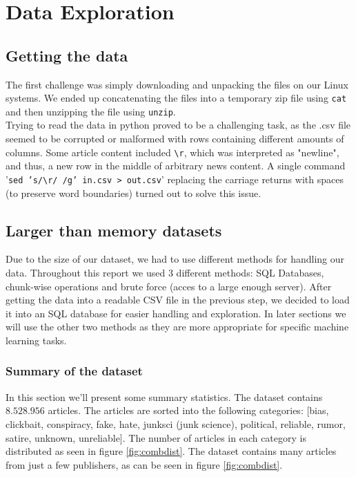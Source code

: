 \section{Data Exploration}

\subsection{Getting the data}
The first challenge was simply downloading and unpacking the files on our Linux systems. We ended up concatenating the
files into a temporary zip file using \texttt{cat} and then unzipping the file using \texttt{unzip}. \\

Trying to read the data in python proved to be a challenging task, as the .csv file seemed to be corrupted or malformed with rows containing different amounts of columns. Some article content included \texttt{\textbackslash r}, which was interpreted as "newline", and thus, a new row in the middle of arbitrary news content. A single command '\texttt{sed 's/\textbackslash r/ /g' in.csv > out.csv}' replacing the carriage returns with spaces (to preserve word boundaries) turned out to solve this issue.\\

\subsection{Larger than memory datasets}
Due to the size of our dataset, we had to use different methods for handling our data. Throughout this report we used 3 different methods: SQL Databases, chunk-wise operations and brute force (acces
to a large enough server). After getting the data into a readable CSV file in the previous step, we decided to load it
into an SQL database for easier handling and exploration. In later sections we will use the other two methods as they
are more appropriate for specific machine learning tasks.


\subsubsection{Summary of the dataset}
In this section we'll present some summary statistics. The dataset contains $ 8.528.956 $ articles. The articles are
sorted into the following categories: [bias, clickbait, conspiracy, fake, hate, junksci (junk science), political,
reliable, rumor, satire, unknown, unreliable]. The number of articles in each category is distributed as seen in figure
\ref{fig:combdist}. The dataset contains many articles from just a few publishers, as can be seen in figure \ref{fig:combdist}.


